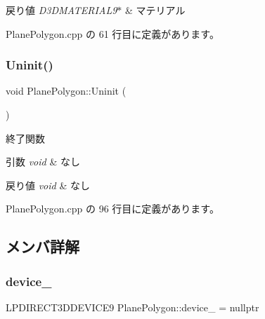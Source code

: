 \begin{DoxyRetVals}{戻り値}
{\em D3\+D\+M\+A\+T\+E\+R\+I\+A\+L9$\ast$} & マテリアル \\
\hline
\end{DoxyRetVals}


 Plane\+Polygon.\+cpp の 61 行目に定義があります。

\mbox{\label{class_plane_polygon_aaf0e9bf23d298371de64bfa4ab76c808}} 
\subsubsection{\texorpdfstring{Uninit()}{Uninit()}}
{\footnotesize\ttfamily void Plane\+Polygon\+::\+Uninit (\begin{DoxyParamCaption}{ }\end{DoxyParamCaption})}



終了関数 


\begin{DoxyParams}{引数}
{\em void} & なし \\
\hline
\end{DoxyParams}

\begin{DoxyRetVals}{戻り値}
{\em void} & なし \\
\hline
\end{DoxyRetVals}


 Plane\+Polygon.\+cpp の 96 行目に定義があります。



\subsection{メンバ詳解}
\mbox{\label{class_plane_polygon_a9b07736e5b36983967d0fac67c39dc82}} 
\subsubsection{\texorpdfstring{device\+\_\+}{device\_}}
{\footnotesize\ttfamily L\+P\+D\+I\+R\+E\+C\+T3\+D\+D\+E\+V\+I\+C\+E9 Plane\+Polygon\+::device\+\_\+ = nullptr\hspace{0.3cm}{\ttfamily [private]}}



